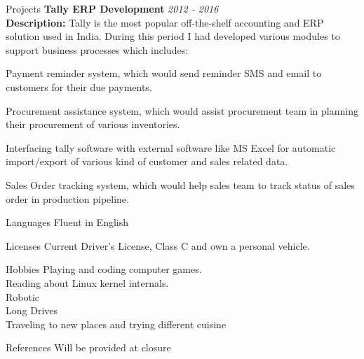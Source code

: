 \documentclass{resume}
\begin{document}
\begin{rSection}{Projects}
{\bf Tally ERP Development} \hfill {\em  2012 - 2016} 
\\{\bf Description:} Tally is the most popular off-the-shelf accounting and ERP solution used in India. During this period I had developed various modules to support business processes which includes:
\begin{rSubsection}{}{}{}{}
\item Payment reminder system, which would send reminder SMS and email to customers for their due payments.
\item Procurement assistance system, which would assist procurement team in planning their procurement of various inventories.
\item Interfacing tally software with external software like MS Excel for automatic import/export of various kind of customer and sales related data.
\item Sales Order tracking system, which would help sales team to track status of sales order in production pipeline.
\end{rSubsection}



\end{rSection}


\begin{rSection}{Languages}
 Fluent in English
\end{rSection}

\begin{rSection}{Licenses}
Current Driver’s License, Class C and own a personal vehicle.
\end{rSection}


\begin{rSection}{Hobbies}
Playing and coding computer games.\\
Reading about Linux kernel internals.\\
Robotic\\
Long Drives\\
Traveling to new places and trying different cuisine\\
\end{rSection}


\begin{rSection}{References}
Will be provided at closure
\end{rSection}
\end{document}
